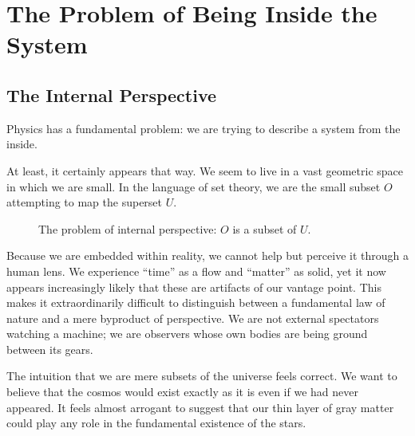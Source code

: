 \chapter{The Problem of Being Inside the System}
\label{chap:problem-of-being-inside}

\section{The Internal Perspective}

Physics has a fundamental problem: we are trying to describe a system from the inside.

At least, it certainly appears that way.
We seem to live in a vast geometric space in which we are small.
In the language of set theory, we are the small subset $O$ attempting to map the superset $U$.

\begin{figure}[h]
    \centering
    \caption{The problem of internal perspective: $O$ is a subset of $U$.}
\end{figure}

Because we are embedded within reality, we cannot help but perceive it through a human lens.
We experience ``time'' as a flow and ``matter'' as solid, yet it now appears increasingly likely that these are artifacts of our vantage point.
This makes it extraordinarily difficult to distinguish between a fundamental law of nature and a mere byproduct of perspective.
We are not external spectators watching a machine; we are observers whose own bodies are being ground between its gears.

The intuition that we are mere subsets of the universe feels correct.
We want to believe that the cosmos would exist exactly as it is even if we had never appeared.
It feels almost arrogant to suggest that our thin layer of gray matter could play any role in the fundamental existence of the stars.

